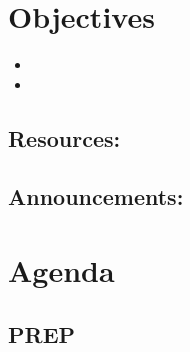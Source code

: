 \documentclass{article}
\theoremstyle{plain}
\theoremstyle{box}
\begin{document}
\section{Objectives}
\begin{itemize}
\item 
\item 
\end{itemize}
\subsection{Resources:}
\subsection{Announcements:}


\newpage
\section{Agenda}
\subsection{}

\newpage
\subsection{}


\newpage
\subsection{PREP}




 
\end{document}
